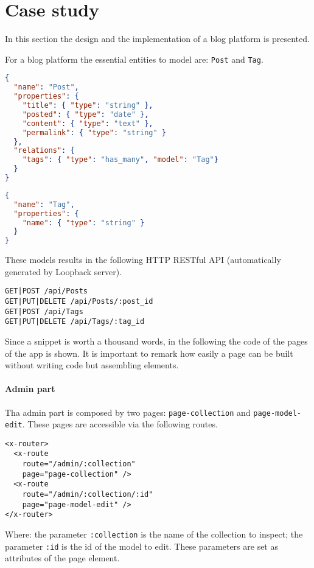 \section{Case study}\label{sec:case-study}
In this section the design and the implementation of a blog platform is presented. 

For a blog platform the essential entities to model are: \texttt{Post} and \texttt{Tag}.

\begin{lstlisting}[language=json]
{
  "name": "Post",
  "properties": {
    "title": { "type": "string" },
    "posted": { "type": "date" },
    "content": { "type": "text" },
    "permalink": { "type": "string" }
  }, 
  "relations": {
    "tags": { "type": "has_many", "model": "Tag"}
  }
}
\end{lstlisting}

\begin{lstlisting}[language=json]
{
  "name": "Tag",
  "properties": {
    "name": { "type": "string" }
  }
}
\end{lstlisting}

These models results in the following HTTP RESTful API (automatically generated by Loopback server).

\begin{lstlisting}
GET|POST /api/Posts
GET|PUT|DELETE /api/Posts/:post_id
GET|POST /api/Tags
GET|PUT|DELETE /api/Tags/:tag_id
\end{lstlisting}

Since a snippet is worth a thousand words, in the following the code of the pages of the app is shown.
It is important to remark how easily a page can be built without writing code but assembling elements. 

\paragraph{Admin part}

Tha admin part is composed by two pages: \texttt{page-collection} and \texttt{page-model-edit}.
These pages are accessible via the following routes.

\begin{lstlisting}[language=HTML5]
<x-router>
  <x-route 
    route="/admin/:collection" 
    page="page-collection" />
  <x-route 
    route="/admin/:collection/:id"
    page="page-model-edit" />
</x-router>
\end{lstlisting}

Where:
the parameter \texttt{:collection} is the name of the collection to inspect;
the parameter \texttt{:id} is the id of the model to edit.
These parameters are set as attributes of the page element.

